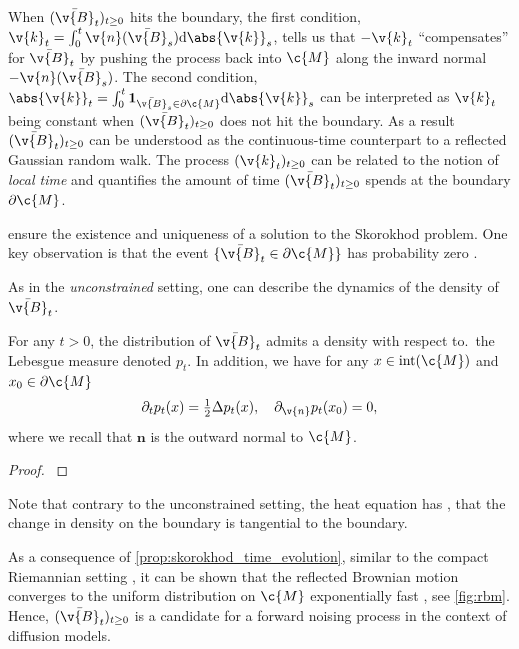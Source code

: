 When \((\bar{ \v{B}}_t)_{t \geq 0}\) hits the boundary, the first condition,  \({ \v{k}_t = \int_0^t \v{n}(\bar{ \v{B}}_s) \mathrm{d} \abs{ \v{k}}_s }\), tells us that \(- \v{k}_t\) ``compensates'' for \(\bar{ \v{B}}_t\) by pushing the process back into \(\c{M}\) along the inward normal \(- \v{n}(\bar{\v{B}}_s)\).
The second condition, \({\abs{ \v{k}}_t = \int_0^t \mathbf{1}_{\bar{ \v{B}}_s \in \partial \c{M}} \mathrm{d} \abs{ \v{k}}_s}\) can be interpreted as \( \v{k}_t\) being constant when \((\bar{ \v{B}}_t)_{t \geq 0}\) does not hit the boundary.
As a result \((\bar{ \v{B}}_t)_{t \geq 0}\) can be understood as the continuous-time counterpart to a reflected Gaussian random walk.
The process \(( \v{k}_t)_{t \geq 0}\) can be related to the notion of \emph{local time} \parencite{revuz2013continuous} and quantifies the amount of time \((\bar{ \v{B}}_t)_{t \geq 0}\) spends at the boundary \(\partial \c{M}\).

\textcite[theorem
	2.1]{lions1984stochastic} ensure the existence and uniqueness of a solution to
the Skorokhod problem.
One key observation is that the event \(\{ \bar{ \v{B}}_t \in \partial \c{M} \}\) has probability zero \parencite[Section 7, Lemma 7]{harrison1987brownian}.

As in the \emph{unconstrained} setting, one can describe the dynamics of the density of \(\bar{ \v{B}}_t\).
\begin{proposition}
	\label{prop:skorokhod_time_evolution}
	For any \(t > 0\), the distribution of \(\bar{ \v{B}}_t\) admits a density with respect to.\
	the Lebesgue measure denoted \(p_t\).
	In addition, we have for any \(x \in \mathrm{int}(\c{M})\) and \(x_0 \in \partial \c{M}\) \begin{equation} \label{eq:heat_eq_rbm} \partial_t p_t(x) = \tfrac{1}{2} \Delta p_t(x) , \quad \partial_{ \v{n}} p_t(x_0) = 0 , \end{equation} where we recall that \(\mathbf{n}\) is the outward normal to \(\c{M}\).
\end{proposition}
\begin{proof}
	\textcite[theorem 2.2]{burdzy2004heat}
\end{proof}
Note that contrary to the unconstrained setting, the heat equation has , that the change in density on the boundary is tangential to the boundary.

As a consequence of \cref{prop:skorokhod_time_evolution}, similar to the compact Riemannian setting \parencite{saloff1994precise}, it can be shown that the reflected Brownian motion converges to the uniform distribution on \(\c{M}\) exponentially fast \parencite{loper2020uniform,burdzy2006traps}, see \cref{fig:rbm}.
Hence, \((\bar{ \v{B}}_t)_{t \geq 0}\) is a candidate for a forward noising process in the context of diffusion models.

